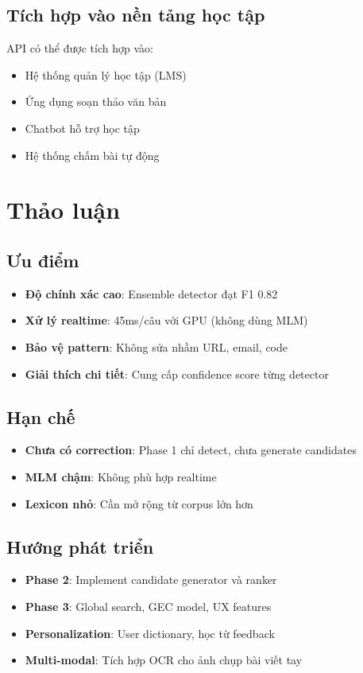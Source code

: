 \documentclass[conference]{IEEEtran}
\begin{document}
\subsection{Tích hợp vào nền tảng học tập}
API có thể được tích hợp vào:
\begin{itemize}
    \item Hệ thống quản lý học tập (LMS)
    \item Ứng dụng soạn thảo văn bản
    \item Chatbot hỗ trợ học tập
    \item Hệ thống chấm bài tự động
\end{itemize}

\section{Thảo luận}

\subsection{Ưu điểm}
\begin{itemize}
    \item \textbf{Độ chính xác cao}: Ensemble detector đạt F1 0.82
    \item \textbf{Xử lý realtime}: 45ms/câu với GPU (không dùng MLM)
    \item \textbf{Bảo vệ pattern}: Không sửa nhầm URL, email, code
    \item \textbf{Giải thích chi tiết}: Cung cấp confidence score từng detector
\end{itemize}

\subsection{Hạn chế}
\begin{itemize}
    \item \textbf{Chưa có correction}: Phase 1 chỉ detect, chưa generate candidates
    \item \textbf{MLM chậm}: Không phù hợp realtime
    \item \textbf{Lexicon nhỏ}: Cần mở rộng từ corpus lớn hơn
\end{itemize}

\subsection{Hướng phát triển}
\begin{itemize}
    \item \textbf{Phase 2}: Implement candidate generator và ranker
    \item \textbf{Phase 3}: Global search, GEC model, UX features
    \item \textbf{Personalization}: User dictionary, học từ feedback
    \item \textbf{Multi-modal}: Tích hợp OCR cho ảnh chụp bài viết tay
\end{itemize}
\end{document}
